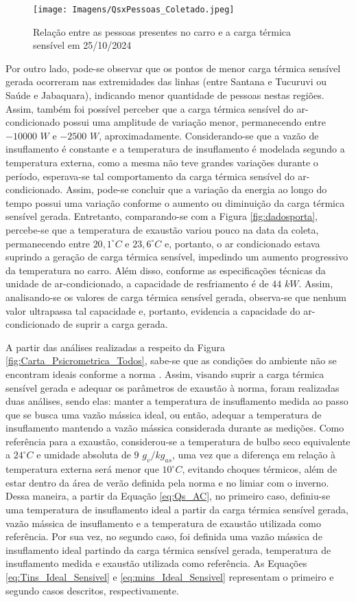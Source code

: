 \documentclass[acronym,symbols,table]{fei}
\begin{document}
\begin{figure}[!htb]
    \centering
    \caption{Relação entre as pessoas presentes no carro e a carga térmica sensível em 25/10/2024}
    \texttt{[image: Imagens/QsxPessoas\_Coletado.jpeg]}
    \label{fig:QsxPessoas_Coletado}
\end{figure}
\newpage
Por outro lado, pode-se observar que os pontos de menor carga térmica sensível gerada ocorreram nas extremidades das linhas (entre Santana e Tucuruvi ou Saúde e Jabaquara), indicando menor quantidade de pessoas nestas regiões. Assim, também foi possível perceber que a carga térmica sensível do ar-condicionado possui uma amplitude de variação menor, permanecendo entre $-10000$ $W$ e $-2500$ $W$, aproximadamente. Considerando-se que a vazão de insuflamento é constante e a temperatura de insuflamento é modelada segundo a temperatura externa, como a mesma não teve grandes variações durante o período, esperava-se tal comportamento da carga térmica sensível do ar-condicionado. Assim, pode-se concluir que a variação da energia ao longo do tempo possui uma variação conforme o aumento ou diminuição da carga térmica sensível gerada. Entretanto, comparando-se com a Figura \ref{fig:dadosporta}, percebe-se que a temperatura de exaustão variou pouco na data da coleta, permanecendo entre $20,1^\circ C$ e $23,6^\circ C$ e, portanto, o ar condicionado estava suprindo a geração de carga térmica sensível, impedindo um aumento progressivo da temperatura no carro. Além disso, conforme as especificações técnicas da unidade de ar-condicionado, a capacidade de resfriamento é de $44$ $kW$. Assim, analisando-se os valores de carga térmica sensível gerada, observa-se que nenhum valor ultrapassa tal capacidade e, portanto, evidencia a capacidade do ar-condicionado de suprir a carga gerada.

A partir das análises realizadas a respeito da Figura \ref{fig:Carta_Psicrometrica_Todos}, sabe-se que as condições do ambiente não se encontram ideais conforme a norma \textcite{abnt216401}. Assim, visando suprir a carga térmica sensível gerada e adequar os parâmetros de exaustão à norma, foram realizadas duas análises, sendo elas: manter a temperatura de insuflamento medida ao passo que se busca uma vazão mássica ideal, ou então, adequar a temperatura de insuflamento mantendo a vazão mássica considerada durante as medições. Como referência para a exaustão, considerou-se a temperatura de bulbo seco equivalente a $24^\circ C$ e umidade absoluta de $9$ $g_{v}/kg_{as}$, uma vez que a diferença em relação à temperatura externa será menor que $10^\circ C$, evitando choques térmicos, além de estar dentro da área de verão definida pela norma e no limiar com o inverno. Dessa maneira, a partir da Equação \ref{eq:Qs_AC}, no primeiro caso, definiu-se uma temperatura de insuflamento ideal a partir da carga térmica sensível gerada, vazão mássica de insuflamento e a temperatura de exaustão utilizada como referência. Por sua vez, no segundo caso, foi definida uma vazão mássica de insuflamento ideal partindo da carga térmica sensível gerada, temperatura de insuflamento medida e exaustão utilizada como referência. As Equações \ref{eq:Tins_Ideal_Sensivel} e \ref{eq:mins_Ideal_Sensivel} representam o primeiro e segundo casos descritos, respectivamente.
\end{document}
